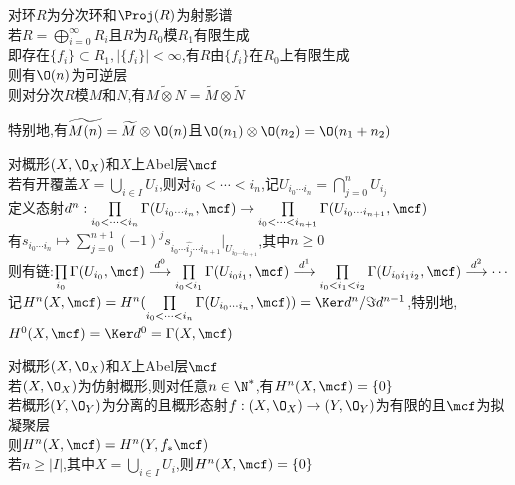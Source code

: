 \begin{dingli}
对环$R$为分次环和$\Proj(R)$为射影谱\\
若$R=\bigoplus\limits_{i=0}^{\infty}R_{i}$且$R$为$R_0$模$R_1$有限生成\\
即存在$\{f_i\}\subset R_1,|\{f_{i}\}|<\infty$,有$R$由$\{f_i\}$在$R_0$上有限生成\\
则有$\O(n)$为可逆层\\
则对分次$R$模$M$和$N$,有$\widetilde{M\otimes N}=\widetilde{M}\otimes\widetilde{N}$
\end{dingli}

\begin{zhu}
特别地,有$\widetilde{M(n)}=\widetilde{M}\otimes\O(n)$且$\O(n_1)\otimes\O(n_2)=\O(n_1+n_2)$
\end{zhu}

\begin{dingyi}
对概形$(X,\O_{X})$和$X$上Abel层$\mcf$\\
若有开覆盖$X=\bigcup\limits_{i\in I}U_i$,则对$i_0<\cdots<i_n$,记$U_{i_0\cdots i_n}=\bigcap\limits_{j=0}^{n}U_{i_j}$\\
定义态射$d^{n}:\prod\limits_{i_0<\cdots<i_{n}}\Gamma(U_{i_0\cdots i_n},\mcf)\to\prod\limits_{i_0<\cdots<i_{n+1}}\Gamma(U_{i_0\cdots i_{n+1}},\mcf)$\\
有$s_{i_0\cdots i_{n}}\mapsto \sum\limits_{j=0}^{n+1}(-1)^{j}s_{i_0\cdots\widehat{i_{j}}\cdots i_{n+1}}|_{U_{i_0\cdots i_{n+1}}}$,其中$n\geq 0$\\
则有链:$\prod\limits_{i_0}\Gamma(U_{i_0},\mcf) \stackrel{d^{0}}{\longrightarrow}\prod\limits_{i_0<i_{1}}\Gamma(U_{i_0i_1},\mcf) \stackrel{d^{1}}{\longrightarrow}\prod\limits_{i_{0}<i_{1}<i_{2}}\Gamma(U_{i_0i_1i_2},\mcf) \stackrel{d^{2}}{\longrightarrow}\cdots$\\  
记$H^{n}(X,\mcf)=H^{n}(\prod\limits_{i_0<\cdots<i_{n}}\Gamma(U_{i_0\cdots i_n},\mcf))=\Ker d^{n}/\Im d^{n-1}$,特别地,$H^{0}(X,\mcf)=\Ker d^{0}=\Gamma(X,\mcf)$
\end{dingyi}

\begin{dingli}
对概形$(X,\O_{X})$和$X$上Abel层$\mcf$\\
若$(X,\O_{X})$为仿射概形,则对任意$n\in\N^*$,有$H^{n}(X,\mcf)=\{0\}$\\
若概形$(Y,\O_{Y})$为分离的且概形态射$f:(X,\O_{X})\to(Y,\O_{Y})$为有限的且$\mcf$为拟凝聚层\\
则$H^{n}(X,\mcf)=H^{n}(Y,f_{*}\mcf)$\\
若$n\geq |I|$,其中$X=\bigcup\limits_{i\in I}U_i$,则$H^{n}(X,\mcf)=\{0\}$
\end{dingli}

